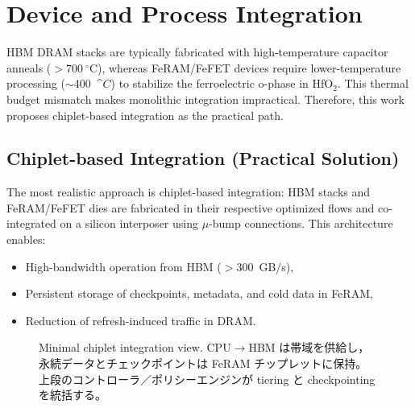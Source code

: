 \section{Device and Process Integration}
HBM DRAM stacks are typically fabricated with high-temperature capacitor anneals ($>700~^\circ$C),
whereas FeRAM/FeFET devices require lower-temperature processing ($\sim$400~^\circ$C$) to stabilize the ferroelectric o-phase in HfO$_2$.
This thermal budget mismatch makes monolithic integration impractical.
Therefore, this work proposes chiplet-based integration as the practical path.

\subsection{Chiplet-based Integration (Practical Solution)}
The most realistic approach is chiplet-based integration:
HBM stacks and FeRAM/FeFET dies are fabricated in their respective optimized flows and co-integrated on a silicon interposer using $\mu$-bump connections.
This architecture enables:
\begin{itemize}
  \item High-bandwidth operation from HBM ($>$300~GB/s),
  \item Persistent storage of checkpoints, metadata, and cold data in FeRAM,
  \item Reduction of refresh-induced traffic in DRAM.
\end{itemize}

\begin{figure}[t]
\centering
{}

\vspace{3pt}
\caption{Minimal chiplet integration view. CPU$\rightarrow$HBM は帯域を供給し，
永続データとチェックポイントは FeRAM チップレットに保持。
上段のコントローラ／ポリシーエンジンが tiering と checkpointing を統括する。}
\label{fig:chiplet_min}
\end{figure}
